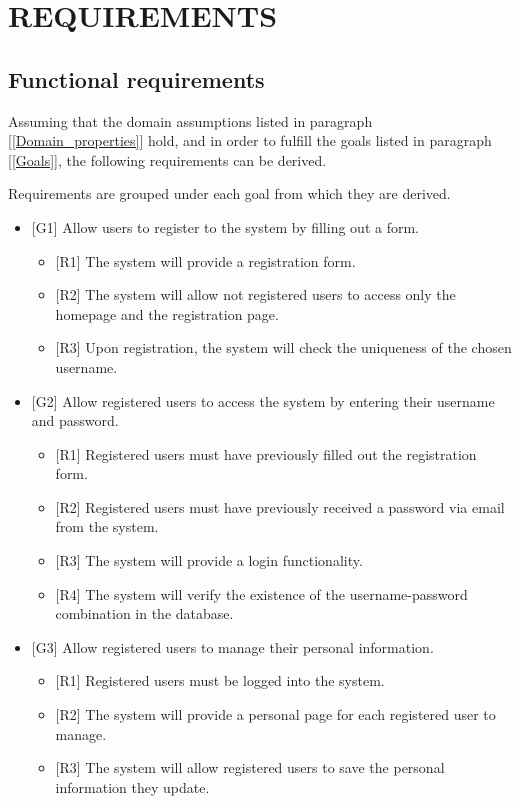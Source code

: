 \section{REQUIREMENTS}
\subsection{Functional requirements}
Assuming that the domain assumptions listed in paragraph [\ref{Domain_properties}] hold, and in order to fulfill the goals listed in paragraph [\ref{Goals}], the following requirements can be derived.

Requirements are grouped under each goal from which they are derived. 
\begin{itemize}
	\item {[G1]} Allow users to register to the system by filling out a form. 
	\begin{itemize}
		\item {[R1]} The system will provide a registration form.
		\item {[R2]} The system will allow not registered users to access only the homepage and the registration page.
		\item {[R3]} Upon registration, the system will check the uniqueness of the chosen username. 
	\end{itemize}
	\item {[G2]} Allow registered users to access the system by entering their username and password.
	\begin{itemize}
		\item {[R1]} Registered users must have previously filled out the registration form.
		\item {[R2]} Registered users must have previously received a password via email from the system.
		\item {[R3]} The system will provide a login functionality.
		\item {[R4]} The system will verify the existence of the username-password combination in the database. 
	\end{itemize}
	\item {[G3]} Allow registered users to manage their personal information.
	\begin{itemize}
		\item {[R1]} Registered users must be logged into the system.
		\item {[R2]} The system will provide a personal page for each registered user to manage.
		\item {[R3]} The system will allow registered users to save the personal information they update.

\end{itemize}
\end{itemize}
